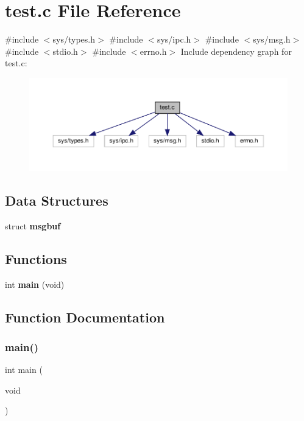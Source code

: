 \section{test.\+c File Reference}
\label{test_8c}
{\ttfamily \#include $<$sys/types.\+h$>$}\newline
{\ttfamily \#include $<$sys/ipc.\+h$>$}\newline
{\ttfamily \#include $<$sys/msg.\+h$>$}\newline
{\ttfamily \#include $<$stdio.\+h$>$}\newline
{\ttfamily \#include $<$errno.\+h$>$}\newline
Include dependency graph for test.\+c\+:\nopagebreak
\begin{figure}[H]
\begin{center}
\leavevmode
\includegraphics[width=350pt]{test_8c__incl}
\end{center}
\end{figure}
\subsection*{Data Structures}
\begin{DoxyCompactItemize}
\item 
struct \textbf{ msgbuf}
\end{DoxyCompactItemize}
\subsection*{Functions}
\begin{DoxyCompactItemize}
\item 
int \textbf{ main} (void)
\end{DoxyCompactItemize}


\subsection{Function Documentation}
\mbox{\label{test_8c_a840291bc02cba5474a4cb46a9b9566fe}} 
\subsubsection{main()}
{\footnotesize\ttfamily int main (\begin{DoxyParamCaption}\item[{void}]{ }\end{DoxyParamCaption})}

